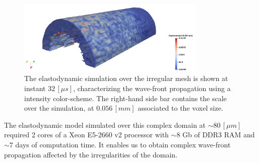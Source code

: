 \begin{figure}[!h]
	\centering
	\includegraphics[width=0.8\textwidth]{images/ImgExt/Cortical3dsc04Mesh1000Fill-T80.png}
	\caption{The elastodynamic simulation over the irregular mesh is shown at instant $32 \, [\mu s]$, characterizing the wave-front propagation using a intensity color-scheme. The right-hand side bar contains the scale over the simulation, at $0.056 \, [mm]$ associated to the voxel size.}
	\label{HomBone-TimeStep}
\end{figure} 

\begin{rem}
The elastodynamic model simulated over this complex domain at $\sim 80 \, [\mu m]$ required 2 cores of a Xeon E5-2660 v2 processor with $\sim 8$ Gb of DDR3 RAM and $\sim 7$ days of computation time. It enables us to obtain complex wave-front propagation affected by the irregularities of the domain.
\end{rem}

